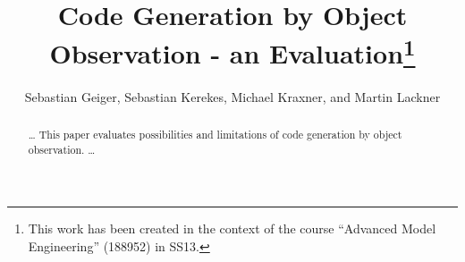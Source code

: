 \documentclass{llncs}
\begin{document}

\title{Code Generation by Object Observation - an Evaluation\footnote{This work has been created in the context of the course ``Advanced Model Engineering'' (188952) in SS13.}}



\author{Sebastian Geiger, Sebastian Kerekes, Michael Kraxner, and Martin Lackner }






\maketitle

\begin{abstract}
 \dots
This paper evaluates possibilities and limitations of code generation by object observation. 
 \dots
\end{abstract}
\end{document}
